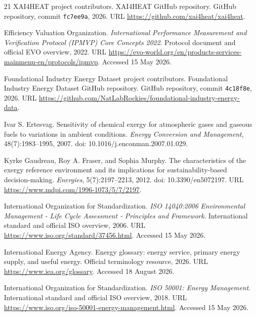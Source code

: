 \documentclass[11pt]{article}
\begin{document}
\begin{thebibliography}{21}
XAI4HEAT project contributors.
\newblock XAI4HEAT GitHub repository.
\newblock GitHub repository, commit \texttt{fc7ee9a}, 2026.
\newblock URL \url{https://github.com/xai4heat/xai4heat}.

Efficiency Valuation Organization.
\newblock \textit{International Performance Measurement and Verification Protocol (IPMVP) Core Concepts 2022}.
\newblock Protocol document and official EVO overview, 2022.
\newblock URL \url{https://evo-world.org/en/products-services-mainmenu-en/protocols/ipmvp}.
\newblock Accessed 15 May 2026.

Foundational Industry Energy Dataset project contributors.
\newblock Foundational Industry Energy Dataset GitHub repository.
\newblock GitHub repository, commit \texttt{4c18f8e}, 2026.
\newblock URL \url{https://github.com/NatLabRockies/foundational-industry-energy-data}.

Ivar S. Ertesvag.
\newblock Sensitivity of chemical exergy for atmospheric gases and gaseous fuels to variations in ambient conditions.
\newblock \textit{Energy Conversion and Management}, 48(7):1983--1995, 2007.
\newblock doi: 10.1016/j.enconman.2007.01.029.

Kyrke Gaudreau, Roy A. Fraser, and Sophia Murphy.
\newblock The characteristics of the exergy reference environment and its implications for sustainability-based decision-making.
\newblock \textit{Energies}, 5(7):2197--2213, 2012.
\newblock doi: 10.3390/en5072197.
\newblock URL \url{https://www.mdpi.com/1996-1073/5/7/2197}.

International Organization for Standardization.
\newblock \textit{ISO 14040:2006 Environmental Management - Life Cycle Assessment - Principles and Framework}.
\newblock International standard and official ISO overview, 2006.
\newblock URL \url{https://www.iso.org/standard/37456.html}.
\newblock Accessed 15 May 2026.

International Energy Agency.
\newblock Energy glossary: energy service, primary energy supply, and useful energy.
\newblock Official terminology resource, 2026.
\newblock URL \url{https://www.iea.org/glossary}.
\newblock Accessed 18 August 2026.

International Organization for Standardization.
\newblock \textit{ISO 50001: Energy Management}.
\newblock International standard and official ISO overview, 2018.
\newblock URL \url{https://www.iso.org/iso-50001-energy-management.html}.
\newblock Accessed 15 May 2026.


\end{thebibliography}
\end{document}
